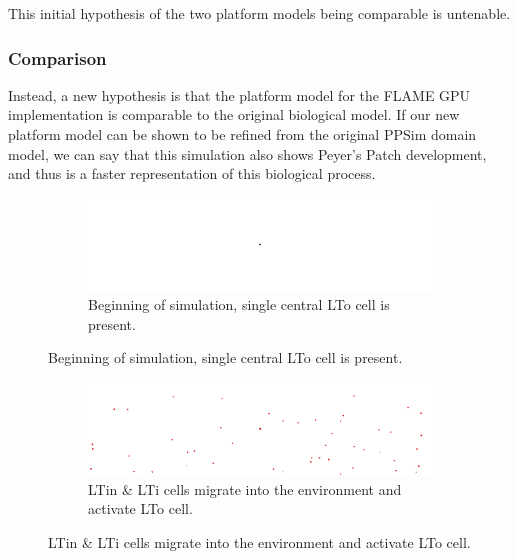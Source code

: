 \documentclass{UoYCSproject}
\begin{document}
This initial hypothesis of the two platform models being comparable is untenable.



\subsubsection{Comparison}
Instead, a new hypothesis is that the platform model for the \gls{FLAME GPU} implementation is comparable to the original biological model.
If our new platform model can be shown to be refined from the original PPSim domain model, we can say that this simulation also shows Peyer's Patch development, and thus is a faster representation of this biological process.

\begin{figure}[htpb]
\begin{subfigure}{\textwidth}
\centering
\includegraphics[width=\textwidth]{Appendix/Sim/Start}
\caption{Beginning of simulation, single central \gls{LTo} cell is present.}
\label{fig:sim_start}
\end{subfigure}
\end{figure}

\begin{figure}[htpb]\ContinuedFloat
\begin{subfigure}{\textwidth}
\centering
\includegraphics[width=\textwidth]{Appendix/Sim/Migration}
\caption{\gls{LTin} \& \gls{LTi} cells migrate into the environment and activate \gls{LTo} cell.}
\label{fig:sim_contact}
\end{subfigure}
\end{figure}
\end{document}
